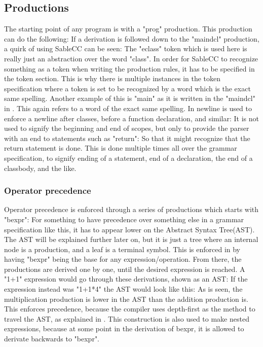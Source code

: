 \subsection{Productions}
The starting point of any \lang{} program is with a "prog" production. This production can do the following: 
If a derivation is followed down to the "maindcl" production, a quirk of using SableCC can be seen: 
The "eclass" token which is used here is really just an abstraction over the word "class". In order for SableCC to recognize something as a token when writing the production rules, it has to be specified in the token section. This is why there is multiple instances in the token specification where a token is set to be recognized by a word which is the exact same spelling. Another example of this is "main" as it is written in the "maindcl" in . This again refers to a word of the exact same spelling.
In \lang{} newline is used to enforce a newline after classes, before a function declaration, and similar: 
It is not used to signify the beginning and end of scopes, but only to provide the parser with an end to statements such as "return": 
\todo{}
So that it might recognize that the return statement is done. This is done multiple times all over the grammar specification, to signify ending of a statement, end of a declaration, the end of a classbody, and the like.

\subsubsection{Operator precedence}
Operator precedence is enforced through a series of productions which starts with "bexpr":
For something to have precedence over something else in a grammar specification like this, it has to appear lower on the Abstract Syntax Tree(AST). The AST will be explained further later on, but it is just a tree where an internal node is a production, and a leaf is a terminal symbol. This is enforced in \lang{} by having "bexpr" being the base for any expression/operation. 
From there, the productions are derived one by one, until the desired expression is reached. A "1+1" expression would go through these derivations, shown as an AST:
If the expression instead was "1+1*4" the AST would look like this:
As is seen, the multiplication production is lower in the AST than the addition production is. This enforces precedence, because the compiler uses depth-first as the method to travel the AST, as explained in . This construction is also used to make nested expressions, because at some point in the derivation of bexpr, it is allowed to derivate backwards to "bexpr".
